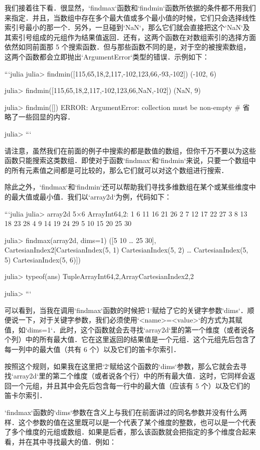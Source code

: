 我们接着往下看．很显然，`findmax`函数和`findmin`函数所依据的条件都不用我们来指定．并且，当数组中存在多个最大值或多个最小值的时候，它们只会选择线性索引号最小的那一个．另外，一旦碰到`NaN`，那么它们就会直接把这个`NaN`及其索引号组成的元组作为结果值返回．还有，这两个函数在对数组索引的选择方面依然如同前面那 5 个搜索函数．但与那些函数不同的是，对于空的被搜索数组，这两个函数都会立即抛出`ArgumentError`类型的错误．示例如下：

```julia
julia> findmin([115,65,18,2,117,-102,123,66,-93,-102])
(-102, 6)

julia> findmin([115,65,18,2,117,-102,123,66,NaN,-102])
(NaN, 9)

julia> findmin([])
ERROR: ArgumentError: collection must be non-empty
# 省略了一些回显的内容．

julia> 
```

请注意，虽然我们在前面的例子中搜索的都是数值的数组，但你千万不要以为这些函数只能搜索这类数组．即使对于函数`findmax`和`findmin`来说，只要一个数组中的所有元素值之间都是可比较的，那么它们就可以对这个数组进行搜索．

除此之外，`findmax`和`findmin`还可以帮助我们寻找多维数组在某个或某些维度中的最大值或最小值．我们以`array2d`为例，代码如下：

```julia
julia> array2d
5×6 Array{Int64,2}:
 1   6  11  16  21  26
 2   7  12  17  22  27
 3   8  13  18  23  28
 4   9  14  19  24  29
 5  10  15  20  25  30

julia> findmax(array2d, dims=1)
([5 10 … 25 30], CartesianIndex{2}[CartesianIndex(5, 1) CartesianIndex(5, 2) … CartesianIndex(5, 5) CartesianIndex(5, 6)])

julia> typeof(ans)
Tuple{Array{Int64,2},Array{CartesianIndex{2},2}}

julia> 
```

可以看到，当我在调用`findmax`函数的时候把`1`赋给了它的关键字参数`dims`．顺便说一下，对于关键字参数，我们必须使用`<name>=<value>`的方式为其赋值，如`dims=1`．此时，这个函数就会去寻找`array2d`里的第一个维度（或者说各个列）中的所有最大值．它在这里返回的结果值是一个元组．这个元组先后包含了每一列中的最大值（共有 6 个）以及它们的笛卡尔索引．

按照这个规则，如果我在这里把`2`赋给这个函数的`dims`参数，那么它就会去寻找`array2d`里的第二个维度（或者说各个行）中的所有最大值．这时，它同样会返回一个元组，并且其中会先后包含每一行中的最大值（应该有 5 个）以及它们的笛卡尔索引．

`findmax`函数的`dims`参数在含义上与我们在前面讲过的同名参数并没有什么两样．这个参数的值在这里既可以是一个代表了某个维度的整数，也可以是一个代表了多个维度的元组或数组．如果是后者，那么该函数就会把指定的多个维度合起来看，并在其中寻找最大的值．例如：

